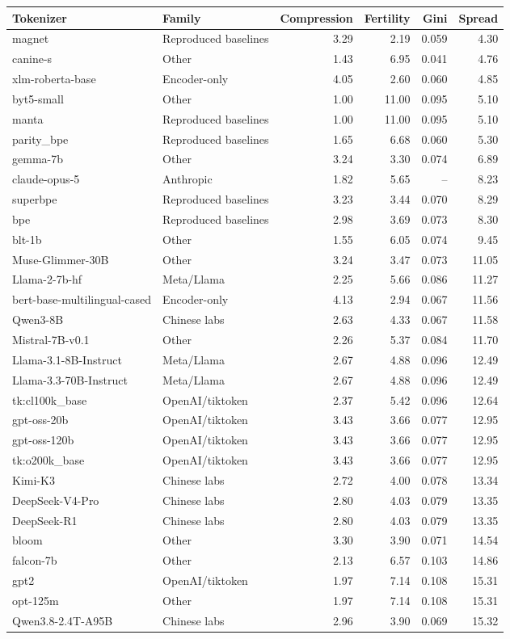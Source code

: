 \documentclass{standalone}
\begin{document}
\begin{tabular}{llrrrr}
\toprule
Tokenizer & Family & Compression & Fertility & Gini & Spread \\
\midrule
magnet & Reproduced baselines & 3.29 & 2.19 & 0.059 & 4.30 \\
canine-s & Other & 1.43 & 6.95 & 0.041 & 4.76 \\
xlm-roberta-base & Encoder-only & 4.05 & 2.60 & 0.060 & 4.85 \\
byt5-small & Other & 1.00 & 11.00 & 0.095 & 5.10 \\
manta & Reproduced baselines & 1.00 & 11.00 & 0.095 & 5.10 \\
parity\_bpe & Reproduced baselines & 1.65 & 6.68 & 0.060 & 5.30 \\
gemma-7b & Other & 3.24 & 3.30 & 0.074 & 6.89 \\
claude-opus-5 & Anthropic & 1.82 & 5.65 & -- & 8.23 \\
superbpe & Reproduced baselines & 3.23 & 3.44 & 0.070 & 8.29 \\
bpe & Reproduced baselines & 2.98 & 3.69 & 0.073 & 8.30 \\
blt-1b & Other & 1.55 & 6.05 & 0.074 & 9.45 \\
Muse-Glimmer-30B & Other & 3.24 & 3.47 & 0.073 & 11.05 \\
Llama-2-7b-hf & Meta/Llama & 2.25 & 5.66 & 0.086 & 11.27 \\
bert-base-multilingual-cased & Encoder-only & 4.13 & 2.94 & 0.067 & 11.56 \\
Qwen3-8B & Chinese labs & 2.63 & 4.33 & 0.067 & 11.58 \\
Mistral-7B-v0.1 & Other & 2.26 & 5.37 & 0.084 & 11.70 \\
Llama-3.1-8B-Instruct & Meta/Llama & 2.67 & 4.88 & 0.096 & 12.49 \\
Llama-3.3-70B-Instruct & Meta/Llama & 2.67 & 4.88 & 0.096 & 12.49 \\
tk:cl100k\_base & OpenAI/tiktoken & 2.37 & 5.42 & 0.096 & 12.64 \\
gpt-oss-20b & OpenAI/tiktoken & 3.43 & 3.66 & 0.077 & 12.95 \\
gpt-oss-120b & OpenAI/tiktoken & 3.43 & 3.66 & 0.077 & 12.95 \\
tk:o200k\_base & OpenAI/tiktoken & 3.43 & 3.66 & 0.077 & 12.95 \\
Kimi-K3 & Chinese labs & 2.72 & 4.00 & 0.078 & 13.34 \\
DeepSeek-V4-Pro & Chinese labs & 2.80 & 4.03 & 0.079 & 13.35 \\
DeepSeek-R1 & Chinese labs & 2.80 & 4.03 & 0.079 & 13.35 \\
bloom & Other & 3.30 & 3.90 & 0.071 & 14.54 \\
falcon-7b & Other & 2.13 & 6.57 & 0.103 & 14.86 \\
gpt2 & OpenAI/tiktoken & 1.97 & 7.14 & 0.108 & 15.31 \\
opt-125m & Other & 1.97 & 7.14 & 0.108 & 15.31 \\
Qwen3.8-2.4T-A95B & Chinese labs & 2.96 & 3.90 & 0.069 & 15.32 \\
\bottomrule
\end{tabular}
\end{document}
